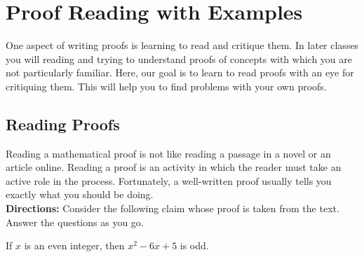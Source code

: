 
\chapter{Proof Reading with Examples}

One aspect of writing proofs is learning to read and critique them.  In later classes you will reading and trying to understand proofs of concepts with which you are not particularly familiar.  Here, our goal is to learn to read proofs with an eye for critiquing them.  This will help you to find problems with your own proofs.

\begin{center}
\end{center}

\section{Reading Proofs}

Reading a mathematical proof is not like reading a passage in a novel or an article online.  Reading a proof is an activity in which the reader must take an active role in the process.  Fortunately, a well-written proof usually tells you exactly what you should be doing.  \\

\noindent \textbf{Directions:}  Consider the following claim whose proof is taken from the text.  Answer the questions as you go.

\begin{claim} If $x$ is an even integer, then $x^2-6x+5$ is odd.
\end{claim}

